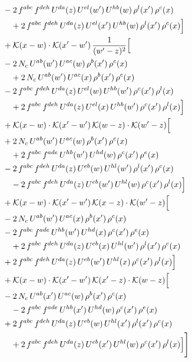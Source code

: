 \begin{align}
& -2\,f^{abc}\,f^{deh}\,U^{da}(z)\,U^{el}(w')\,U^{hb}(w)\,\rho^{l}(x')\,\rho^{c}(x) \notag\\
&\quad +2\,f^{abc}\,f^{deh}\,U^{da}(z)\,U^{el}(x')\,U^{hb}(w)\,\rho^{l}(x')\,\rho^{c}(x)\Big]\notag\\
& +\mathcal{K}(x-w)\cdot\mathcal{K}(x'-w')\,\frac{1}{(w'-z)^{2}}\Big[\notag\\
& -2\,N_{c}\,U^{ab}(w')\,U^{ac}(w)\,\rho^{b}(x')\,\rho^{c}(x)\notag\\
&\quad +2\,N_{c}\,U^{ab}(w')\,U^{ac}(x)\,\rho^{b}(x')\,\rho^{c}(x)\notag\\
& -2\,f^{abc}\,f^{deh}\,U^{da}(z)\,U^{el}(w)\,U^{hb}(w')\,\rho^{c}(x')\,\rho^{l}(x) \notag\\
&\quad +2\,f^{abc}\,f^{deh}\,U^{da}(z)\,U^{el}(x)\,U^{hb}(w')\,\rho^{c}(x')\,\rho^{l}(x)\Big]\notag\\
& +\mathcal{K}(x-w)\cdot\mathcal{K}(x'-w')\,\mathcal{K}(w-z)\cdot\mathcal{K}(w'-z)\Big[\notag\\
& +2\,N_{c}\,U^{ab}(w')\,U^{ac}(w)\,\rho^{b}(x')\,\rho^{c}(x)\notag\\
&\quad +2\,f^{abc}\,f^{ade}\,U^{hb}(w')\,U^{hd}(w)\,\rho^{c}(x')\,\rho^{e}(x)\notag\\
& -2\,f^{abc}\,f^{deh}\,U^{da}(z)\,U^{eb}(w)\,U^{hl}(w')\,\rho^{l}(x')\,\rho^{c}(x) \notag\\
&\quad -2\,f^{abc}\,f^{deh}\,U^{da}(z)\,U^{eb}(w')\,U^{hl}(w)\,\rho^{c}(x')\,\rho^{l}(x)\Big]\notag\\
& +\mathcal{K}(x-w)\cdot\mathcal{K}(x'-w')\,\mathcal{K}(x-z)\cdot\mathcal{K}(w'-z)\Big[\notag\\
& -2\,N_{c}\,U^{ab}(w')\,U^{ac}(x)\,\rho^{b}(x')\,\rho^{c}(x)\notag\\
& -2\,f^{abc}\,f^{ade}\,U^{hb}(w')\,U^{hd}(x)\,\rho^{c}(x')\,\rho^{e}(x) \notag\\
&\quad +2\,f^{abc}\,f^{deh}\,U^{da}(z)\,U^{eb}(x)\,U^{hl}(w')\,\rho^{l}(x')\,\rho^{c}(x)\notag\\
& +2\,f^{abc}\,f^{deh}\,U^{da}(z)\,U^{eb}(w')\,U^{hl}(x)\,\rho^{c}(x')\,\rho^{l}(x)\Big]\notag\\
& +\mathcal{K}(x-w)\cdot\mathcal{K}(x'-w')\,\mathcal{K}(x'-z)\cdot\mathcal{K}(w-z)\Big[\notag\\
& -2\,N_{c}\,U^{ab}(x')\,U^{ac}(w)\,\rho^{b}(x')\,\rho^{c}(x)\notag\\&\quad -2\,f^{abc}\,f^{ade}\,U^{hb}(x')\,U^{hd}(w)\,\rho^{c}(x')\,\rho^{e}(x)\notag\\
& +2\,f^{abc}\,f^{deh}\,U^{da}(z)\,U^{eb}(w)\,U^{hl}(x')\,\rho^{l}(x')\,\rho^{c}(x) \notag\\
&\quad +2\,f^{abc}\,f^{deh}\,U^{da}(z)\,U^{eb}(x')\,U^{hl}(w)\,\rho^{c}(x')\,\rho^{l}(x)\Big]\Bigg]
\end{align}
